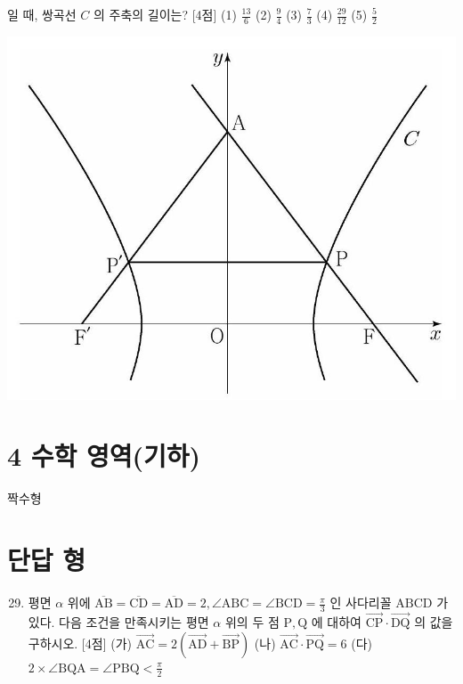 \documentclass[10pt]{article}
\begin{document}
일 때, 쌍곡선 $C$ 의 주축의 길이는? [4점]
(1) $\frac{13}{6}$
(2) $\frac{9}{4}$
(3) $\frac{7}{3}$
(4) $\frac{29}{12}$
(5) $\frac{5}{2}$

\begin{center}
\includegraphics[max width=\textwidth]{2023_05_19_a9cef858603f6abf5411g-39(1)}
\end{center}

\section{4 수학 영역(기하)}
짝수형

\section{단답 형}
\begin{enumerate}
  \setcounter{enumi}{28}
  \item 평면 $\alpha$ 위에 $\overline{\mathrm{AB}}=\overline{\mathrm{CD}}=\overline{\mathrm{AD}}=2, \angle \mathrm{ABC}=\angle \mathrm{BCD}=\frac{\pi}{3}$ 인 사다리꼴 $\mathrm{ABCD}$ 가 있다. 다음 조건을 만족시키는 평면 $\alpha$ 위의 두 점 $\mathrm{P}, \mathrm{Q}$ 에 대하여 $\overrightarrow{\mathrm{CP}} \cdot \overrightarrow{\mathrm{DQ}}$ 의 값을 구하시오. [4점]
(가) $\overrightarrow{\mathrm{AC}}=2(\overrightarrow{\mathrm{AD}}+\overrightarrow{\mathrm{BP}})$
(나) $\overrightarrow{\mathrm{AC}} \cdot \overrightarrow{\mathrm{PQ}}=6$
(다) $2 \times \angle \mathrm{BQA}=\angle \mathrm{PBQ}<\frac{\pi}{2}$
\end{enumerate}
\end{document}
